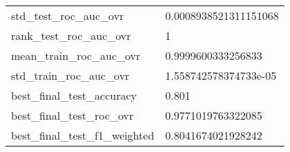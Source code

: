 \begin{tabular}{ll}
std\_test\_roc\_auc\_ovr          &                              0.0008938521311151068 \\
rank\_test\_roc\_auc\_ovr         &                                                  1 \\
mean\_train\_roc\_auc\_ovr        &                                 0.9999600333256833 \\
std\_train\_roc\_auc\_ovr         &                              1.558742578374733e-05 \\
best\_final\_test\_accuracy      &                                              0.801 \\
best\_final\_test\_roc\_ovr       &                                 0.9771019763322085 \\
best\_final\_test\_f1\_weighted   &                                 0.8041674021928242 \\
\bottomrule
\end{tabular}
